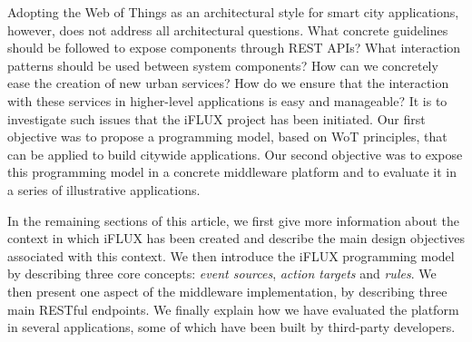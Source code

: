 Adopting the Web of Things as an architectural style for smart city applications, however, does not address all architectural questions. What concrete guidelines should be followed to expose components through REST APIs? What interaction patterns should be used between system components? How can we concretely ease the creation of new urban services? How do we ensure that the interaction with these services in higher-level applications is easy and manageable? It is to investigate such issues that the iFLUX project has been initiated. Our first objective was to propose a programming model, based on WoT principles, that can be applied to build citywide applications. Our second objective was to expose this programming model in a concrete middleware platform and to evaluate it in a series of illustrative applications.

In the remaining sections of this article, we first give more information about the context in which iFLUX has been created and describe the main design objectives associated with this context. We then introduce the iFLUX programming model by describing three core concepts: \emph{event sources}, \emph{action targets} and \emph{rules}. We then present one aspect of the middleware implementation, by describing three main RESTful endpoints. We finally explain how we have evaluated the platform in several applications, some of which have been built by third-party developers.